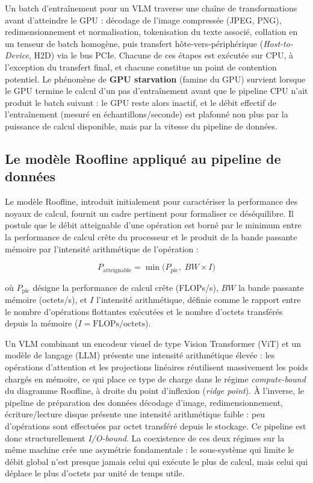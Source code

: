 \documentclass[12pt,a4paper]{report}
\begin{document}
Un batch d'entraînement pour un VLM traverse une chaîne de transformations avant d'atteindre le GPU : décodage de l'image compressée (JPEG, PNG), redimensionnement et normalisation, tokenisation du texte associé, collation en un tenseur de batch homogène, puis transfert hôte-vers-périphérique (\textit{Host-to-Device}, H2D) via le bus PCIe. Chacune de ces étapes est exécutée sur CPU, à l'exception du transfert final, et chacune constitue un point de contention potentiel. Le phénomène de \textbf{GPU starvation} (famine du GPU) survient lorsque le GPU termine le calcul d'un pas d'entraînement avant que le pipeline CPU n'ait produit le batch suivant : le GPU reste alors inactif, et le débit effectif de l'entraînement (mesuré en échantillons/seconde) est plafonné non plus par la puissance de calcul disponible, mais par la vitesse du pipeline de données.

\subsection{Le modèle Roofline appliqué au pipeline de données}

Le modèle Roofline, introduit initialement pour caractériser la performance des noyaux de calcul, fournit un cadre pertinent pour formaliser ce déséquilibre. Il postule que le débit atteignable d'une opération est borné par le minimum entre la performance de calcul crête du processeur et le produit de la bande passante mémoire par l'intensité arithmétique de l'opération :

\begin{equation}
\label{eq:roofline}
P_{\text{atteignable}} = \min\bigl(P_{\text{pic}},\; BW \times I\bigr)
\end{equation}

où $P_{\text{pic}}$ désigne la performance de calcul crête (FLOPs/s), $BW$ la bande passante mémoire (octets/s), et $I$ l'intensité arithmétique, définie comme le rapport entre le nombre d'opérations flottantes exécutées et le nombre d'octets transférés depuis la mémoire ($I = \text{FLOPs}/\text{octets}$).

Un VLM combinant un encodeur visuel de type Vision Transformer (ViT) et un modèle de langage (LLM) présente une intensité arithmétique élevée : les opérations d'attention et les projections linéaires réutilisent massivement les poids chargés en mémoire, ce qui place ce type de charge dans le régime \textit{compute-bound} du diagramme Roofline, à droite du point d'inflexion (\textit{ridge point}). À l'inverse, le pipeline de préparation des données décodage d'image, redimensionnement, écriture/lecture disque présente une intensité arithmétique faible : peu d'opérations sont effectuées par octet transféré depuis le stockage. Ce pipeline est donc structurellement \textit{I/O-bound}. La coexistence de ces deux régimes sur la même machine crée une asymétrie fondamentale : le sous-système qui limite le débit global n'est presque jamais celui qui exécute le plus de calcul, mais celui qui déplace le plus d'octets par unité de temps utile.
\end{document}
